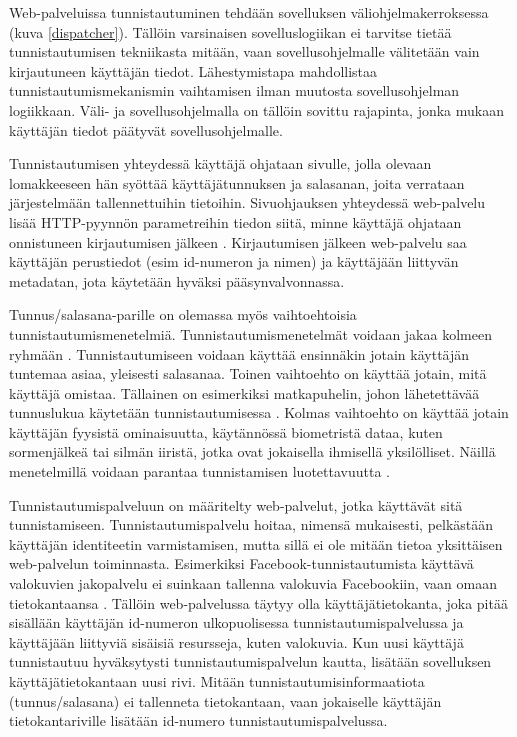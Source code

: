 Web-palveluissa tunnistautuminen tehdään sovelluksen väliohjelmakerroksessa (kuva \ref{dispatcher}). Tällöin varsinaisen sovelluslogiikan ei tarvitse tietää tunnistautumisen tekniikasta mitään, vaan sovellusohjelmalle välitetään vain kirjautuneen käyttäjän tiedot. Lähestymistapa mahdollistaa tunnistautumismekanismin vaihtamisen ilman muutosta sovellusohjelman logiikkaan. Väli- ja sovellusohjelmalla on tällöin sovittu rajapinta, jonka mukaan käyttäjän tiedot päätyvät sovellusohjelmalle.

Tunnistautumisen yhteydessä käyttäjä ohjataan sivulle, jolla olevaan lomakkeeseen hän syöttää käyttäjätunnuksen ja salasanan, joita verrataan järjestelmään tallennettuihin tietoihin. Sivuohjauksen yhteydessä web-palvelu lisää HTTP-pyynnön parametreihin tiedon siitä, minne käyttäjä ohjataan onnistuneen kirjautumisen jälkeen \cite{oauth2_0}. Kirjautumisen jälkeen web-palvelu saa käyttäjän perustiedot (esim id-numeron ja nimen) ja käyttäjään liittyvän metadatan, jota käytetään hyväksi pääsynvalvonnassa.

Tunnus/salasana-parille on olemassa myös vaihtoehtoisia tunnistautumismenetelmiä. Tunnistautumismenetelmät voidaan jakaa kolmeen ryhmään \cite{nisti}. Tunnistautumiseen voidaan käyttää ensinnäkin jotain käyttäjän tuntemaa asiaa, yleisesti salasanaa. Toinen vaihtoehto on käyttää jotain, mitä käyttäjä omistaa. Tällainen on esimerkiksi matkapuhelin, johon lähetettävää tunnuslukua käytetään tunnistautumisessa \cite{5336918}. Kolmas vaihtoehto on käyttää jotain käyttäjän fyysistä ominaisuutta, käytännössä biometristä dataa, kuten sormenjälkeä tai silmän iiristä, jotka ovat jokaisella ihmisellä yksilölliset. Näillä menetelmillä voidaan parantaa tunnistamisen luotettavuutta \cite{nisti}.

Tunnistautumispalveluun on määritelty web-palvelut, jotka käyttävät sitä tunnistamiseen. Tunnistautumispalvelu hoitaa, nimensä mukaisesti, pelkästään käyttäjän identiteetin varmistamisen, mutta sillä ei ole mitään tietoa yksittäisen web-palvelun toiminnasta. Esimerkiksi Facebook-tunnistautumista käyttävä valokuvien jakopalvelu ei suinkaan tallenna valokuvia Facebookiin, vaan omaan tietokantaansa \cite{web_resources}. Tällöin web-palvelussa täytyy olla käyttäjätietokanta, joka pitää sisällään käyttäjän id-numeron ulkopuolisessa tunnistautumispalvelussa ja käyttäjään liittyviä sisäisiä resursseja, kuten valokuvia. Kun uusi käyttäjä tunnistautuu hyväksytysti tunnistautumispalvelun kautta, lisätään sovelluksen käyttäjätietokantaan uusi rivi. Mitään tunnistautumisinformaatiota (tunnus/salasana) ei tallenneta tietokantaan, vaan jokaiselle käyttäjän tietokantariville lisätään id-numero tunnistautumispalvelussa.